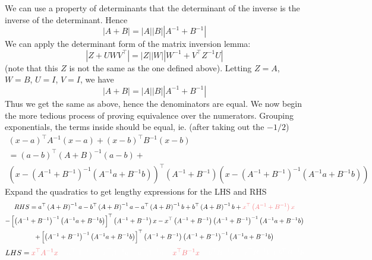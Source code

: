\documentclass[11pt]{report} %
\begin{document}
We can use a property of determinants that the determinant of the inverse is the inverse of the determinant. Hence
\begin{equation}
\left|A+B\right|=\left|A\right|\left|B\right|\left|A^{-1}+B^{-1}\right|
\end{equation}
We can apply the determinant form of the matrix inversion lemma:
\begin{equation}
\left|Z+UWV^{\top}\right|=\left|Z\right|\left|W\right|\left|W^{-1}+V^{\top}Z^{-1}U\right|
\end{equation}
(note that this $Z$ is not the same as the one defined above). Letting $Z = A$, $W = B$, $U = I$, $V = I$, we have
\begin{equation}
\left|A+B\right|=\left|A\right|\left|B\right|\left|A^{-1}+B^{-1}\right|
\end{equation}
Thus we get the same as above, hence the denominators are equal. We now begin the more tedious process of proving equivalence over the numerators. Grouping exponentials, the terms inside should be equal, ie. (after taking out the $-1/2$)
\begin{multline}
\left(x-a\right)^{\top}A^{-1}\left(x-a\right)+\left(x-b\right)^{\top}B^{-1}\left(x-b\right) \\
=\left(a-b\right)^{\top}\left(A+B\right)^{-1}\left(a-b\right)+ \\
\left(x-\left(A^{-1}+B^{-1}\right)^{-1}\left(A^{-1}a+B^{-1}b\right)\right)^{\top}\left(A^{-1}+B^{-1}\right)\left(x-\left(A^{-1}+B^{-1}\right)^{-1}\left(A^{-1}a+B^{-1}b\right)\right)
\end{multline}
Expand the quadratics to get lengthy expressions for the LHS and RHS
\begin{multline}
RHS = a^{\top}\left(A+B\right)^{-1}a-b^{\top}\left(A+B\right)^{-1}a-a^{\top}\left(A+B\right)^{-1}b+b^{\top}\left(A+B\right)^{-1}b+ \red x^{\top}\left(A^{-1}+B^{-1}\right)x\black \\
-\left[\left(A^{-1}+B^{-1}\right)^{-1}\left(A^{-1}a+B^{-1}b\right)\right]^{\top}\left(A^{-1}+B^{-1}\right)x-x^{\top}\left(A^{-1}+B^{-1}\right)\left(A^{-1}+B^{-1}\right)^{-1}\left(A^{-1}a+B^{-1}b\right) \\
+\left[\left(A^{-1}+B^{-1}\right)^{-1}\left(A^{-1}a+B^{-1}b\right)\right]^{\top}\left(A^{-1}+B^{-1}\right)\left(A^{-1}+B^{-1}\right)^{-1}\left(A^{-1}a+B^{-1}b\right)
\end{multline}
\begin{multline}
LHS=\red x^{\top}A^{-1}x\black -a^{\top}A^{-1}x-x^{\top}A^{-1}a+a^{\top}A^{-1}a+ \red x^{\top}B^{-1}x\black -b^{\top}B^{-1}x-x^{\top}B^{-1}b+b^{\top}B^{-1}b
\end{multline}
\end{document}
